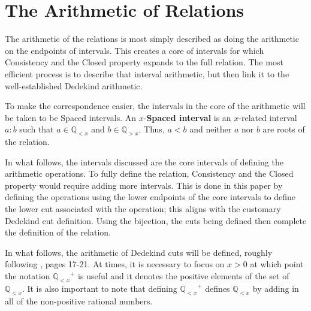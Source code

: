 \documentclass[12pt]{article}
\newcommand{\qcut}[2][x]{\ensuremath{\mathbb{Q}_{#2 #1}}}
\newcommand{\qlt}[1][x]{\qcut[#1]{<}}
\newcommand{\qgt}[1][x]{\qcut[#1]{>}}
\begin{document}
\section{The Arithmetic of Relations}

The arithmetic of the relations is most simply described as doing the arithmetic on the endpoints of intervals. This creates a core of intervals for which Consistency and the Closed property expands to the full relation. The most efficient process is to describe that interval arithmetic, but then link it to the well-established Dedekind arithmetic. 

To make the correspondence easier, the intervals in the core of the arithmetic will be taken to be Spaced intervals. An $x$-\textbf{Spaced interval} is an $x$-related interval $a:b$ such that $a \in \qlt$ and $b \in \qgt$. Thus, $a < b$ and neither $a$ nor $b$ are roots of the relation. 

In what follows, the intervals discussed are the core intervals of defining the arithmetic operations. To fully define the relation, Consistency and the Closed property would require adding more intervals. This is done in this paper by defining the operations using the lower endpoints of the core intervals to define the lower cut associated with the operation; this aligns with the customary Dedekind cut definition. Using the bijection, the cuts being defined then complete the definition of the relation.  

In what follows, the arithmetic of Dedekind cuts will be defined, roughly following \cite{rudin}, pages 17-21.  At times, it is necessary to focus on $x > 0$ at which point the notation $\qlt^+$ is useful and it denotes the positive elements of the set of $\qlt$. It is also important to note that defining $\qlt^+$ defines $\qlt$ by adding in all of the non-positive rational numbers.
\end{document}
